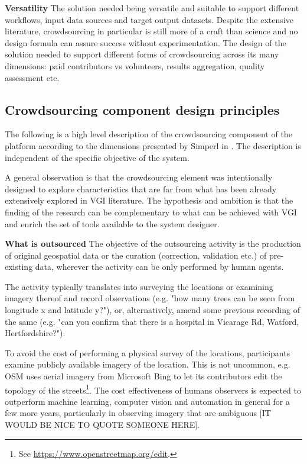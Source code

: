 \textbf{Versatility} The solution needed being versatile and suitable to support different workflows, input data sources and target output datasets. Despite the extensive literature, crowdsourcing in particular is still more of a craft than science and no design formula can assure success without experimentation. The design of the solution needed to support different forms of crowdsourcing across its many dimensions: paid contributors vs volunteers, results aggregation, quality assessment etc.

\subsection{Crowdsourcing component design principles}

The following is a high level description of the crowdsourcing component of the platform according to the dimensions presented by Simperl in \cite{Wearethedata:2015uo}. The description is independent of the specific objective of the system. 

A general observation is that the crowdsourcing element was intentionally designed to explore characteristics that are far from what has been already extensively explored in VGI literature. The hypothesis and ambition is that the finding of the research can be complementary to what can be achieved with VGI and enrich the set of tools available to the system designer.

\textbf{What is outsourced} The objective of the outsourcing activity is the production of original geospatial data or the curation (correction, validation etc.) of pre-existing data, wherever the activity can be only performed by human agents. 

The activity typically translates into surveying the locations or examining imagery thereof and record observations (e.g. "how many trees can be seen from longitude x and latitude y?"), or, alternatively, amend some previous recording of the same (e.g. "can you confirm that there is a hospital in Vicarage Rd, Watford, Hertfordshire?"). 

To avoid the cost of performing a physical survey of the locations, participants examine publicly available imagery of the location. This is not uncommon, e.g. OSM uses aerial imagery from Microsoft Bing to let its contributors edit the topology of the streets\footnote{See \url{https://www.openstreetmap.org/edit}.}. The cost effectiveness of humans observers is expected to outperform machine learning, computer vision and automation in general for a few more years, particularly in observing imagery that are ambiguous [IT WOULD BE NICE TO QUOTE SOMEONE HERE].

